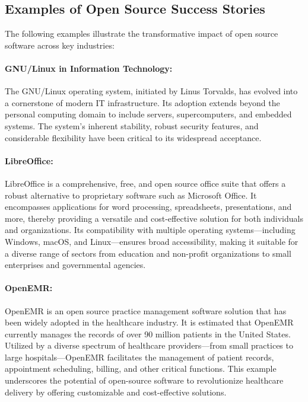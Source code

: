 \subsection{Examples of Open Source Success Stories}

The following examples illustrate the transformative impact of open source software across key industries:

\paragraph{GNU/Linux in Information Technology:}  
The GNU/Linux operating system, initiated by Linus Torvalds, has evolved into a cornerstone of modern IT infrastructure. Its adoption extends beyond the personal computing domain to include servers, supercomputers, and embedded systems. The system’s inherent stability, robust security features, and considerable flexibility have been critical to its widespread acceptance.
\cite{Open-source-Success-Stories}

\paragraph{LibreOffice:}  
LibreOffice is a comprehensive, free, and open source office suite that offers a robust alternative to proprietary software such as Microsoft Office. It encompasses applications for word processing, spreadsheets, presentations, and more, thereby providing a versatile and cost-effective solution for both individuals and organizations. Its compatibility with multiple operating systems—including Windows, macOS, and Linux—ensures broad accessibility, making it suitable for a diverse range of sectors from education and non-profit organizations to small enterprises and governmental agencies.
\cite{LibreOffice-Website}

\paragraph{OpenEMR:}  
OpenEMR is an open source practice management software solution that has been widely adopted in the healthcare industry. It is estimated that OpenEMR currently manages the records of over 90 million patients in the United States. Utilized by a diverse spectrum of healthcare providers—from small practices to large hospitals—OpenEMR facilitates the management of patient records, appointment scheduling, billing, and other critical functions. This example underscores the potential of open-source software to revolutionize healthcare delivery by offering customizable and cost-effective solutions.

